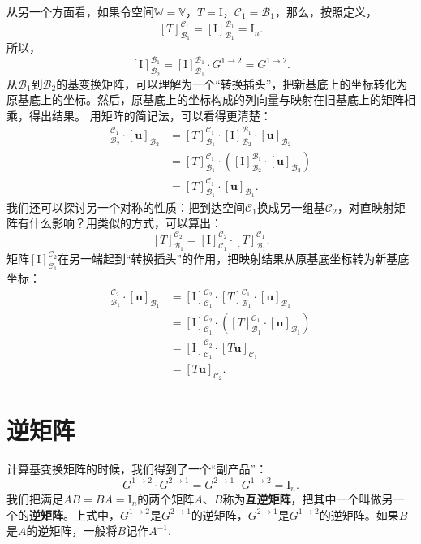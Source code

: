 \documentclass[12pt,UTF8]{ctexbook}
\begin{document}
从另一个方面看，如果令空间$\mathbb{W} = \mathbb{V}$，$T = \mathrm{I}$，$\mathcal{C}_1 = \mathcal{B}_1$，那么，按照定义，
$$[T]_{\mathcal{B}_1}^{\mathcal{C}_1} = [\mathrm{I}]_{\mathcal{B}_1}^{\mathcal{B}_1} = \mathrm{I}_n.$$
所以，
$$[\mathrm{I}]_{\mathcal{B}_2}^{\mathcal{B}_1} = [\mathrm{I}]_{\mathcal{B}_1}^{\mathcal{B}_1} \cdot G^{1\rightarrow 2} = G^{1\rightarrow 2}.$$
从$\mathcal{B}_1$到$\mathcal{B}_2$的基变换矩阵，可以理解为一个“转换插头”，把新基底上的坐标转化为原基底上的坐标。然后，原基底上的坐标构成的列向量与映射在旧基底上的矩阵相乘，得出结果。
用矩阵的简记法，可以看得更清楚：
\begin{align*}
[T]_{\mathcal{B}_2}^{\mathcal{C}_1} \cdot [\mathbf{u}]_{\mathcal{B}_2} &= [T]_{\mathcal{B}_1}^{\mathcal{C}_1} \cdot [\mathrm{I}]_{\mathcal{B}_2}^{\mathcal{B}_1} \cdot [\mathbf{u}]_{\mathcal{B}_2} \\
&= [T]_{\mathcal{B}_1}^{\mathcal{C}_1} \cdot \left([\mathrm{I}]_{\mathcal{B}_2}^{\mathcal{B}_1} \cdot [\mathbf{u}]_{\mathcal{B}_2}\right) \\
&= [T]_{\mathcal{B}_1}^{\mathcal{C}_1} \cdot [\mathbf{u}]_{\mathcal{B}_1}.
\end{align*}
我们还可以探讨另一个对称的性质：把到达空间$\mathcal{C}_1$换成另一组基$\mathcal{C}_2$，对直映射矩阵有什么影响？用类似的方式，可以算出：
$$[T]_{\mathcal{B}_1}^{\mathcal{C}_2} = [\mathrm{I}]_{\mathcal{C}_1}^{\mathcal{C}_2} \cdot [T]_{\mathcal{B}_1}^{\mathcal{C}_1} .$$
矩阵$[\mathrm{I}]_{\mathcal{C}_1}^{\mathcal{C}_2}$在另一端起到“转换插头”的作用，把映射结果从原基底坐标转为新基底坐标：
\begin{align*}
[T]_{\mathcal{B}_1}^{\mathcal{C}_2} \cdot [\mathbf{u}]_{\mathcal{B}_1} &= [\mathrm{I}]_{\mathcal{C}_1}^{\mathcal{C}_2} \cdot [T]_{\mathcal{B}_1}^{\mathcal{C}_1} \cdot [\mathbf{u}]_{\mathcal{B}_1} \\
&= [\mathrm{I}]_{\mathcal{C}_1}^{\mathcal{C}_2} \cdot \left([T]_{\mathcal{B}_1}^{\mathcal{C}_1} \cdot [\mathbf{u}]_{\mathcal{B}_1}\right) \\
&= [\mathrm{I}]_{\mathcal{C}_1}^{\mathcal{C}_2} \cdot [T\mathbf{u}]_{\mathcal{C}_1} \\
&= [T\mathbf{u}]_{\mathcal{C}_2}.
\end{align*}

\section{逆矩阵}

计算基变换矩阵的时候，我们得到了一个“副产品”：
$$G^{1\rightarrow 2} \cdot G^{2\rightarrow 1} = G^{2\rightarrow 1} \cdot G^{1\rightarrow 2} = \mathrm{I}_n.$$
我们把满足$AB=BA=\mathrm{I}_n$的两个矩阵$A$、$B$称为\textbf{互逆矩阵}，把其中一个叫做另一个的\textbf{逆矩阵}。上式中，$G^{1\rightarrow 2}$是$G^{2\rightarrow 1}$的逆矩阵，$G^{2\rightarrow 1}$是$G^{1\rightarrow 2}$的逆矩阵。如果$B$是$A$的逆矩阵，一般将$B$记作$A^{-1}$.
\end{document}
